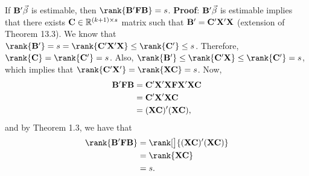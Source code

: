 \begin{Theorem}{}{}
    If $ \mathbf{B}'\vec{\beta} $ is estimable, then
    $ \rank{\Matrix{B}'\Matrix{F}\Matrix{B}}=s $.
    \tcblower{}
    \textbf{Proof}: $ \mathbf{B}'\vec{\beta} $
    is estimable implies that there exists $ \mathbf{C}\in\mathbb{R}^{(k+1)\times s} $
    matrix such that $ \mathbf{B}'=\mathbf{C}'\mathbf{X}'\mathbf{X} $ (extension of Theorem 13.3).
    We know that $ \rank{\Matrix{B}'}=s=\rank{\Matrix{C}'\Matrix{X}'\Matrix{X}}\le \rank{\Matrix{C}'}\le s $.
    Therefore, $ \rank{\Matrix{C}}=\rank{\Matrix{C}'}=s $. Also,
    $ \rank{\Matrix{B}'}\le \rank{\Matrix{C}'\Matrix{X}}\le \rank{\Matrix{C}'}=s $,
    which implies that $ \rank{\Matrix{C}'\Matrix{X}'}=\rank{\Matrix{X}\Matrix{C}}=s $.
    Now,
    \begin{align*}
        \mathbf{B}'\mathbf{F}\mathbf{B}
         & =\mathbf{C}'\mathbf{X}'\mathbf{X}\mathbf{F}\mathbf{X}'\mathbf{X}\mathbf{C} \\
         & =\mathbf{C}'\mathbf{X}'\mathbf{X}\mathbf{C}                                \\
         & =(\mathbf{X}\mathbf{C})'(\mathbf{X}\mathbf{C}),
    \end{align*}
    and by Theorem 1.3, we have that
    \begin{align*}
        \rank{\Matrix{B}'\Matrix{F}\Matrix{B}}
         & =\rank[\big]{(\Matrix{X}\Matrix{C})'(\Matrix{X}\Matrix{C})} \\
         & =\rank{\Matrix{X}\Matrix{C}}                                \\
         & =s.
    \end{align*}
\end{Theorem}
